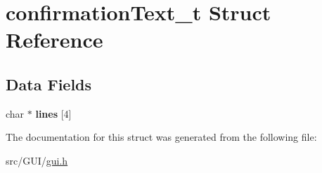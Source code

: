 \hypertarget{structconfirmation_text__t}{}\section{confirmation\+Text\+\_\+t Struct Reference}
\label{structconfirmation_text__t}
\subsection*{Data Fields}
\begin{DoxyCompactItemize}
\item 
char $\ast$ {\bfseries lines} \mbox{[}4\mbox{]}\hypertarget{structconfirmation_text__t_a6047b936fce2a8d9825b83646e117803}{}\label{structconfirmation_text__t_a6047b936fce2a8d9825b83646e117803}

\end{DoxyCompactItemize}


The documentation for this struct was generated from the following file\+:\begin{DoxyCompactItemize}
\item 
src/\+G\+U\+I/\hyperlink{gui_8h}{gui.\+h}\end{DoxyCompactItemize}
